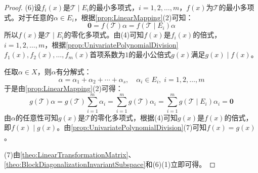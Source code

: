 \begin{proof}
	(6)设$f_i(x)$是$\mathcal{T}\mid E_i$的最小多项式，$i=1,2,\dots,m$，$f(x)$为$\mathcal{T}$的最小多项式。对于任意的$\alpha\in E_i$，根据\cref{prop:LinearMapping}(2)可知：
	\begin{equation*}
		\mathbf{0}=f(\mathcal{T})\alpha=f(\mathcal{T}\mid E_i)\alpha
	\end{equation*}
	所以$f(x)$是$\mathcal{T}\mid E_i$的零化多项式。由(4)可知$f(x)$是$f_i(x)$的倍式，$i=1,2,\dots,m$，根据\cref{prop:UnivariatePolynomialDivision}$f_1(x),f_2(x),\dots,f_m(x)$首项系数为$1$的最小公倍式$g(x)$满足$g(x)\mid f(x)$。\par
	任取$\alpha\in X$，则$\alpha$有分解式：
	\begin{equation*}
		\alpha=\alpha_1+\alpha_2+\cdots+\alpha_s,\quad\alpha_i\in E_i,\;i=1,2,\dots,m
	\end{equation*}
	于是由\cref{prop:LinearMapping}(2)可得：
	\begin{equation*}
		g(\mathcal{T})\alpha=g(\mathcal{T})\sum_{i=1}^{m}\alpha_i=\sum_{i=1}^{m}g(\mathcal{T})\alpha_i=\sum_{i=1}^{m}g(\mathcal{T}\mid E_i)\alpha_i=\mathbf{0}
	\end{equation*}
	由$\alpha$的任意性可知$g(x)$是$\mathcal{T}$的零化多项式，根据(4)可知$g(x)$是$f(x)$的倍式，即$f(x)\mid g(x)$。由\cref{prop:UnivariatePolynomialDivision}(7)可知$f(x)=g(x)$。\par
	(7)由\cref{theo:LinearTransformationMatrix}、\cref{theo:BlockDiagonalizationInvariantSubspace}和(6)(1)立即可得。
\end{proof}
